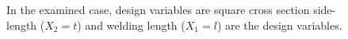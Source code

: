 \begin{figure}
\begin{minipage}[b]{1\linewidth}
 \centering
\end{minipage}
\caption{In the examined case, design variables are square cross section side-length ($X_2 = t$) and welding length ($X_1 = l$) are the design variables.} 
\label{case}
\end{figure}


